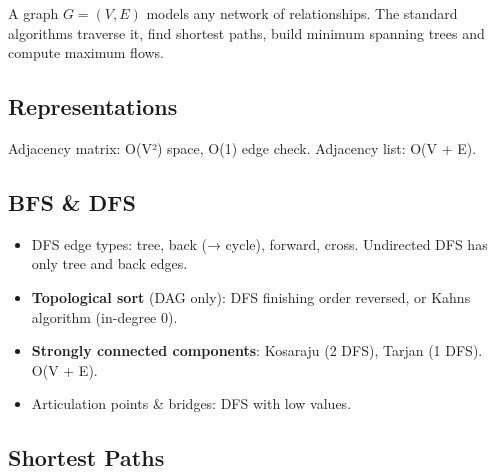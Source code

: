 A graph \(G = (V, E)\) models any network of relationships. The standard algorithms traverse it, find shortest
paths, build minimum spanning trees and compute maximum flows.

\needspace{161pt}

\hypertarget{p2-07--81-representations}{%
\subsection{Representations}\label{p2-07--81-representations}}

Adjacency matrix: O(V²) space, O(1) edge check. Adjacency list: O(V + E).

\needspace{95pt}

\hypertarget{p2-07--82-bfs--dfs}{%
\subsection{BFS \& DFS}\label{p2-07--82-bfs--dfs}}



\begin{itemize}
\tightlist
\item
  DFS edge types: tree, back (→ cycle), forward, cross. Undirected DFS has only tree and back edges.
\item
  \textbf{Topological sort} (DAG only): DFS finishing order reversed, or Kahn\textquotesingle s algorithm (in-degree 0).
\item
  \textbf{Strongly connected components}: Kosaraju (2 DFS), Tarjan (1 DFS). O(V + E).
\item
  Articulation points \& bridges: DFS with low values.
\end{itemize}

\needspace{130pt}

\hypertarget{p2-07--83-shortest-paths}{%
\subsection{Shortest Paths}\label{p2-07--83-shortest-paths}}

\begingroup\small

